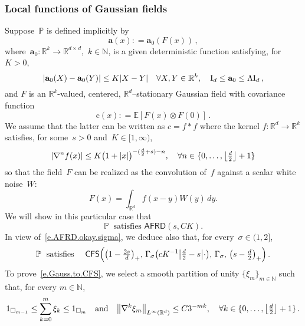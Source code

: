 \documentclass[11pt]{article} %
\let\oldsquare\square %
\renewcommand{\square}{\oldsquare}
\numberwithin{equation}{section}
\theoremstyle{definition}
\let\originalleft\left
\let\originalright\right
\renewcommand{\left}{\mathopen{}\mathclose\bgroup\originalleft}
\renewcommand{\right}{\aftergroup\egroup\originalright}
\newcommand*{\Id}{\ensuremath{\mathrm{I}_d}}
\newcommand*{\N}{\ensuremath{\mathbb{N}}}
\newcommand*{\R}{\ensuremath{\mathbb{R}}}
\newcommand*{\Rd}{\ensuremath{\mathbb{R}^d}}
\renewcommand{\a}{\mathbf{a}}
\newcommand{\cu}{\square}
\renewcommand{\P}{\mathbb{P}}
\newcommand{\E}{\mathbb{E}}
\newcommand{\indc}{1}
\newcommand{\CFS}{\mathsf{CFS}}
\newcommand{\AFRD}{\mathsf{AFRD}}
\begin{document}
\subsubsection{Local functions of Gaussian fields}
\label{ss.GRF}
Suppose~$\P$ is defined implicitly by
\begin{equation}
\label{e.Gaussa0}
\a (x) : = \a_0(F(x)) \,,
\end{equation}
where~$\a_0 : \R^k \to \R^{d\times d}$,~$k\in\N$, is a given deterministic function satisfying, for~$K>0$,  
\begin{equation}
\label{e.Gaussa0.lip}
\left| \a_0 (X) - \a_0(Y) \right| \leq K |X-Y| \quad \forall X,Y \in \R^k, \quad 
 \Id \leq \a_0 \leq \Lambda  \Id
\,,
\end{equation}
and $F$ is an $\R^k$-valued, centered, $\Rd$--stationary Gaussian field with covariance function 
\begin{equation}
\mathrm{c}(x) : = \E [ F(x) \otimes F(0) ]\,.
\end{equation}
We assume that the latter can be written as $c = f \ast f$ where the kernel $f:\Rd \to \R^k$ satisfies, for some~$s>0$ and~$K\in [1,\infty)$, 
\begin{equation}
\label{e.kerneldecay.ass}
\left| \nabla^n f(x) \right|
\leq 
K\bigl(1+|x| \bigr)^{-(\frac d2+s)-n},
\quad 
\forall n\in\{ 0,\ldots, \left\lfloor \tfrac d2 \right\rfloor +1\}
\end{equation}
so that the field~$F$ can be realized as the convolution of~$f$ against a scalar white noise~$W$:
\begin{equation}
F(x) = \int_{\Rd} f(x-y)W(y)\,dy.
\end{equation}
We will show in this particular case that  
\begin{equation}
\label{e.Gauss.to.AFRD}
\P \ \mbox{ satisfies } \AFRD(s,CK).
\end{equation}
In view of~\eqref{e.AFRD.okay.sigma},
we deduce also that, for every~$\sigma \in (1,2]$, 
\begin{align}
\label{e.Gauss.to.CFS}
\P \ \mbox{ satisfies }  \quad
\CFS \Bigl(  
\bigl( 1 - \tfrac {2s}{d} \bigr)_+ , \,
\Gamma_\sigma \bigl( cK^{-1} \bigl| \tfrac d2-s\bigr| \cdot \bigr), \,
\Gamma_\sigma, \,
\bigl( s - \tfrac d2 \bigr)_+
\Bigr)\,.
\end{align}
To prove~\eqref{e.Gauss.to.CFS}, we select a smooth partition of unity 
$\{ \xi_{m} \}_{m\in\N}$ such that, for every $m\in\N$, 
\begin{align*}
\indc_{\cu_{m-1}}
\leq
\sum_{k=0}^m \xi_k
\leq
\indc_{\cu_{m}}
\quad \text{and} \quad
\big\| \nabla^k \xi_m \big\|_{L^\infty(\Rd)}
\leq 
C3^{-mk},
\quad 
\forall k\in\{ 0,\ldots, \left\lfloor \tfrac d2 \right\rfloor +1\}
\,.
\end{align*}
\end{document}
